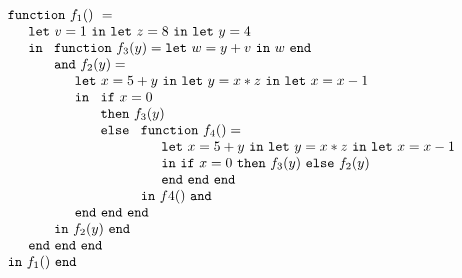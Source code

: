 \begin{equation}
\label{FunctionalConstructionProgram9}
\begin{array}{l}
\mathtt{function}\ f_1()\ = \\
  \quad
  \begin{array}{l}
     \mathtt{let}\ v = 1 \ 
     \mathtt{in\ let}\ z = 8 \ 
     \mathtt{in\ let}\ y = 4\\
     \mathtt{in}\ 
     \begin{array}[t]{l}
       \mathtt{function}\ f_3(y) = 
          \mathtt{let}\ w = y+v\ \mathtt{in}\ w\ \mathtt{end}\\
       \mathtt{and}\ f_2(y) =\\
         \quad
         \begin{array}{l}
           \mathtt{let}\ x = 5+y\
           \mathtt{in\ let}\ y = x*z\
           \mathtt{in\ let}\ x = x-1\\
           \mathtt{in}\
           \begin{array}[t]{l}
             \mathtt{if}\ x=0\\
             \mathtt{then}\ f_3(y)\\ 
             \mathtt{else}\
               \begin{array}[t]{l}
                 \mathtt{function}\ f_4() =\\
                 \quad
                 \begin{array}{l}
                   \mathtt{let}\ x = 5+y\
                   \mathtt{in\ let}\ y = x*z\
                   \mathtt{in\ let}\ x = x-1\\
                   \mathtt{in}\
                     \mathtt{if}\ x=0\
                     \mathtt{then}\ f_3(y)\ 
                     \mathtt{else}\ f_2(y)\\
                   \mathtt{end\ end\ end}
                 \end{array}\\
                 \mathtt{in}\ f4()\ \mathtt{and}
               \end{array}
           \end{array}\\
           \mathtt{end\ end\ end}
         \end{array}\\
     \mathtt{in}\ f_2(y)\ \mathtt{end}
     \end{array}\\
     \mathtt{end\ end\ end}\\
   \end{array}\\
\mathtt{in}\ f_1()\  \mathtt{end}
\end{array}
\end{equation}
